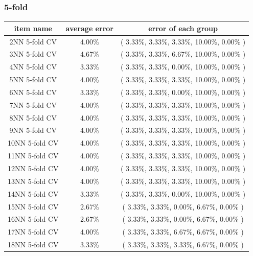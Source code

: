 \documentclass[11pt,a4paper]{article}
\begin{document}
\subsubsection{5-fold}
\begin{center}
    \begin{tabular} {|| c | c | c ||}
        \hline
        item name & average error & error of each group \\ \hline
        2NN 5-fold CV & 4.00\% & ( 3.33\%, 3.33\%, 3.33\%, 10.00\%, 0.00\% ) \\ \hline
        3NN 5-fold CV & 4.67\% & ( 3.33\%, 3.33\%, 6.67\%, 10.00\%, 0.00\% ) \\ \hline
        4NN 5-fold CV & 3.33\% & ( 3.33\%, 3.33\%, 0.00\%, 10.00\%, 0.00\% ) \\ \hline
        5NN 5-fold CV & 4.00\% & ( 3.33\%, 3.33\%, 3.33\%, 10.00\%, 0.00\% ) \\ \hline
        6NN 5-fold CV & 3.33\% & ( 3.33\%, 3.33\%, 0.00\%, 10.00\%, 0.00\% ) \\ \hline
        7NN 5-fold CV & 4.00\% & ( 3.33\%, 3.33\%, 3.33\%, 10.00\%, 0.00\% ) \\ \hline
        8NN 5-fold CV & 4.00\% & ( 3.33\%, 3.33\%, 3.33\%, 10.00\%, 0.00\% ) \\ \hline
        9NN 5-fold CV & 4.00\% & ( 3.33\%, 3.33\%, 3.33\%, 10.00\%, 0.00\% ) \\ \hline
        10NN 5-fold CV & 4.00\% & ( 3.33\%, 3.33\%, 3.33\%, 10.00\%, 0.00\% ) \\ \hline
        11NN 5-fold CV & 4.00\% & ( 3.33\%, 3.33\%, 3.33\%, 10.00\%, 0.00\% ) \\ \hline
        12NN 5-fold CV & 4.00\% & ( 3.33\%, 3.33\%, 3.33\%, 10.00\%, 0.00\% ) \\ \hline
        13NN 5-fold CV & 4.00\% & ( 3.33\%, 3.33\%, 3.33\%, 10.00\%, 0.00\% ) \\ \hline
        14NN 5-fold CV & 3.33\% & ( 3.33\%, 3.33\%, 0.00\%, 10.00\%, 0.00\% ) \\ \hline
        15NN 5-fold CV & 2.67\% & ( 3.33\%, 3.33\%, 0.00\%, 6.67\%, 0.00\% ) \\ \hline
        16NN 5-fold CV & 2.67\% & ( 3.33\%, 3.33\%, 0.00\%, 6.67\%, 0.00\% ) \\ \hline
        17NN 5-fold CV & 4.00\% & ( 3.33\%, 3.33\%, 6.67\%, 6.67\%, 0.00\% ) \\ \hline
        18NN 5-fold CV & 3.33\% & ( 3.33\%, 3.33\%, 3.33\%, 6.67\%, 0.00\% ) \\ \hline

\end{tabular}
\end{center}
\end{document}
